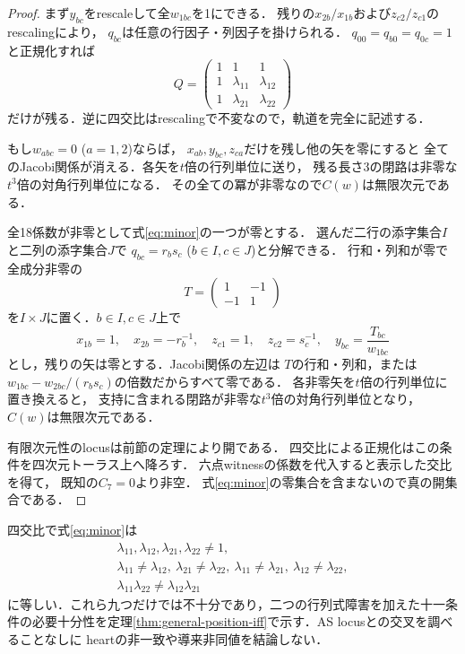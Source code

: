 \begin{proof}
まず$y_{bc}$をrescaleして全$w_{1bc}$を1にできる．
残りの$x_{2b}/x_{1b}$および$z_{c2}/z_{c1}$のrescalingにより，
$q_{bc}$は任意の行因子・列因子を掛けられる．
$q_{00}=q_{b0}=q_{0c}=1$と正規化すれば
\[
Q=\begin{pmatrix}1&1&1\\1&\lambda_{11}&\lambda_{12}\\
1&\lambda_{21}&\lambda_{22}\end{pmatrix}
\]
だけが残る．逆に四交比はrescalingで不変なので，軌道を完全に記述する．

もし$w_{abc}=0$ ($a=1,2$)ならば，
$x_{ab},y_{bc},z_{ca}$だけを残し他の矢を零にすると
全てのJacobi関係が消える．各矢を$t$倍の行列単位に送り，
残る長さ3の閉路は非零な$t^3$倍の対角行列単位になる．
その全ての冪が非零なので$C(w)$は無限次元である．

全18係数が非零として式\eqref{eq:minor}の一つが零とする．
選んだ二行の添字集合$I$と二列の添字集合$J$で
$q_{bc}=r_bs_c$ ($b\in I,c\in J$)と分解できる．
行和・列和が零で全成分非零の
\[
T=\begin{pmatrix}1&-1\\-1&1\end{pmatrix}
\]
を$I\times J$に置く．$b\in I,c\in J$上で
\[
x_{1b}=1,\quad x_{2b}=-r_b^{-1},\quad
z_{c1}=1,\quad z_{c2}=s_c^{-1},\quad
y_{bc}=\frac{T_{bc}}{w_{1bc}}
\]
とし，残りの矢は零とする．Jacobi関係の左辺は
$T$の行和・列和，または
$w_{1bc}-w_{2bc}/(r_bs_c)$の倍数だからすべて零である．
各非零矢を$t$倍の行列単位に置き換えると，
支持に含まれる閉路が非零な$t^3$倍の対角行列単位となり，
$C(w)$は無限次元である．

有限次元性のlocusは前節の定理により開である．
四交比による正規化はこの条件を四次元トーラス上へ降ろす．
六点witnessの係数を代入すると表示した交比を得て，
既知の$C_7=0$より非空．
式\eqref{eq:minor}の零集合を含まないので真の開集合である．
\end{proof}

\begin{remark}[九つの明示的な禁止divisor]
四交比で式\eqref{eq:minor}は
\[
\begin{gathered}
\lambda_{11},\lambda_{12},\lambda_{21},\lambda_{22}\ne1,\\
\lambda_{11}\ne\lambda_{12},\ 
\lambda_{21}\ne\lambda_{22},\
\lambda_{11}\ne\lambda_{21},\
\lambda_{12}\ne\lambda_{22},\\
\lambda_{11}\lambda_{22}\ne\lambda_{12}\lambda_{21}
\end{gathered}
\]
に等しい．これら九つだけでは不十分であり，二つの行列式障害を加えた十一条件の必要十分性を定理\ref{thm:general-position-iff}で示す．AS locusとの交叉を調べることなしに
heartの非一致や導来非同値を結論しない．
\end{remark}




